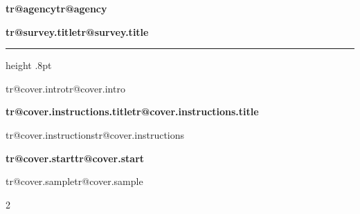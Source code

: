 \documentclass[11pt,letterpaper]{article}
\makeatletter
\newif\ifSurveyRTL
\newcommand{\tr}[1]{%
  \ifcsname tr@#1\endcsname\csname tr@#1\endcsname
  \else\PackageError{survey}{Missing translation: #1}{Regenerate dictionaries from the workbook.}\fi}
\makeatother
\begin{document}
\pagestyle{empty}
\thispagestyle{empty}
\vspace*{.45in}
{\ifSurveyRTL\raggedleft\fi{}\par}
\par\vspace{.32in}
{\large\bfseries\tr{agency}\par}
\vspace{.22in}
{\fontsize{29}{36}\selectfont\bfseries\tr{survey.title}\par}
\vspace{.26in}
\hrule height .8pt
\vspace{.3in}
{\fontsize{12}{18}\selectfont\tr{cover.intro}\par}
\vspace{.4in}
{\large\bfseries\tr{cover.instructions.title}\par}
\vspace{.12in}
{\fontsize{12}{18}\selectfont\tr{cover.instructions}\par}
\vfill
{\bfseries\tr{cover.start}\par}
\vspace{.16in}
{\small\color{black!65}\tr{cover.sample}\par}
\clearpage
\setcounter{page}{1}
\pagestyle{survey}
\setlength{\columnsep}{.28in}
\setlength{\multicolsep}{0pt}
\setlength{\parindent}{0pt}
\setlength{\parskip}{0pt}
\ifSurveyRTL\RLmulticolcolumns\else\LRmulticolcolumns\fi
\raggedcolumns
\begin{multicols}{2}

\end{multicols}
\end{document}
